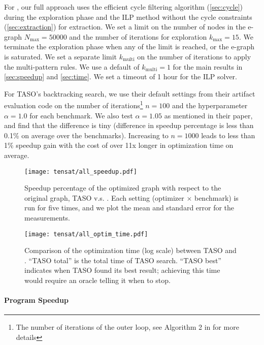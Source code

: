 For \ourname{}, our full approach uses the efficient cycle filtering algorithm (\autoref{sec:cycle}) during the exploration phase and the ILP method without the cycle constraints (\autoref{sec:extraction}) for extraction.
We set a limit on the number of nodes in the e-graph $N_{\textrm{max}}=50000$ and the number of iterations for exploration $k_{\textrm{max}}=15$.
We terminate the exploration phase when any of the limit is reached, or the e-graph is saturated.
We set a separate limit $k_{\textrm{multi}}$ on the number of iterations to apply the multi-pattern rules.
We use a default of $k_{\textrm{multi}}=1$ for the main results in \autoref{sec:speedup} and \autoref{sec:time}.
We set a timeout of 1 hour for the ILP solver.

For TASO's backtracking search, we use their default settings from their artifact evaluation code on the number of iterations\footnote{The number of iterations of the outer loop, see Algorithm 2 in \cite{taso} for more details} $n=100$ and the hyperparameter $\alpha=1.0$ for each benchmark.
We also test $\alpha=1.05$ as mentioned in their paper, and find that the difference is tiny (difference in speedup percentage is less than 0.1\% on average over the benchmarks).
Increasing to $n=1000$ leads to less than 1\% speedup gain with the cost of over 11x longer in optimization time on average.


\begin{figure}
  \centering
  \texttt{[image: tensat/all\_speedup.pdf]}
  \caption{
    Speedup percentage of the optimized graph with respect to the original graph, TASO v.s. \ourname{}.
    Each setting (optimizer $\times$ benchmark) is run for five times, and we plot the mean and standard error for the measurements.
  }\label{fig:speedup}
  \vspace{2em}

  \texttt{[image: tensat/all\_optim\_time.pdf]}
  \caption{
    Comparison of the optimization time (log scale) between TASO and \ourname{}.
    ``TASO total'' is the total time of TASO search.
    ``TASO best'' indicates when TASO found its best result;
    achieving this time would require an oracle telling it when to stop.
  }\label{fig:overhead}
\end{figure}

\paragraph{Program Speedup}
\label{sec:speedup}

